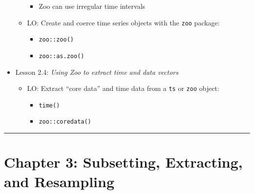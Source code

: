 \documentclass[
]{book}
\providecommand{\tightlist}{%
  \setlength{\itemsep}{0pt}\setlength{\parskip}{0pt}}
\begin{document}
\begin{itemize}
\begin{itemize}
    \begin{itemize}
    \tightlist
    \item
      Zoo can use irregular time intervals
    \end{itemize}
  \item
    LO: Create and coerce time series objects with the \texttt{zoo} package:

    \begin{itemize}
    \tightlist
    \item
      \texttt{zoo::zoo()}
    \item
      \texttt{zoo::as.zoo()}
    \end{itemize}
  \end{itemize}
\item
  Lesson 2.4: \emph{Using Zoo to extract time and data vectors}

  \begin{itemize}
  \tightlist
  \item
    LO: Extract ``core data'' and time data from a \texttt{ts} or \texttt{zoo} object:

    \begin{itemize}
    \tightlist
    \item
      \texttt{time()}
    \item
      \texttt{zoo::coredata()}
    \end{itemize}
  \end{itemize}
\end{itemize}

\begin{center}\rule{0.5\linewidth}{0.5pt}\end{center}

\hypertarget{chapter-3-subsetting-extracting-and-resampling}{%
\section{Chapter 3: Subsetting, Extracting, and Resampling}\label{chapter-3-subsetting-extracting-and-resampling}}
\end{document}
